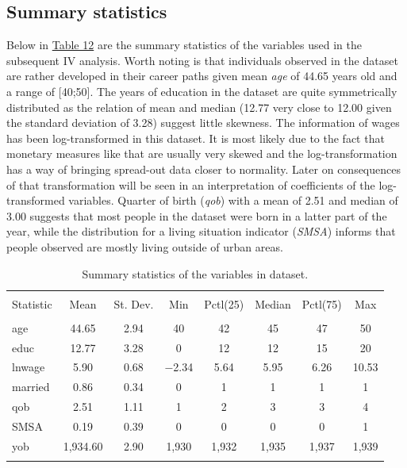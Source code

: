 \documentclass{article}
\begin{document}
\subsection{Summary statistics}

Below in \hyperref[tab:descriptiveIV]{Table 12} are the summary statistics of the variables used in the subsequent IV analysis. Worth noting is that individuals observed in the dataset are rather developed in their career paths given mean \textit{age} of 44.65 years old and a range of [40;50]. The years of education in the dataset are quite symmetrically distributed as the relation of mean and median (12.77 very close to 12.00 given the standard deviation of 3.28) suggest little skewness. The information of wages has been log-transformed in this dataset. It is most likely due to the fact that monetary measures like that are usually very skewed and the log-transformation has a way of bringing spread-out data closer to normality. Later on consequences of that transformation will be seen in an interpretation of coefficients of the log-transformed variables. Quarter of birth (\textit{qob}) with a mean of 2.51 and median of 3.00 suggests that most people in the dataset were born in a latter part of the year, while the distribution for a living situation indicator (\textit{SMSA}) informs that people observed are mostly living outside of urban areas.

\begin{table}[!htbp] \centering 
  \caption{Summary statistics of the variables in dataset.} 
  \label{tab:descriptiveIV} 
\begin{tabular}{@{\extracolsep{5pt}}lccccccc} 
\\[-1.8ex]\hline 
\hline \\[-1.8ex] 
Statistic & \multicolumn{1}{c}{Mean} & \multicolumn{1}{c}{St. Dev.} & \multicolumn{1}{c}{Min} & \multicolumn{1}{c}{Pctl(25)} & \multicolumn{1}{c}{Median} & \multicolumn{1}{c}{Pctl(75)} & \multicolumn{1}{c}{Max} \\ 
\hline \\[-1.8ex] 
age & 44.65 & 2.94 & 40 & 42 & 45 & 47 & 50 \\ 
educ & 12.77 & 3.28 & 0 & 12 & 12 & 15 & 20 \\ 
lnwage & 5.90 & 0.68 & $-$2.34 & 5.64 & 5.95 & 6.26 & 10.53 \\ 
married & 0.86 & 0.34 & 0 & 1 & 1 & 1 & 1 \\ 
qob & 2.51 & 1.11 & 1 & 2 & 3 & 3 & 4 \\ 
SMSA & 0.19 & 0.39 & 0 & 0 & 0 & 0 & 1 \\ 
yob & 1,934.60 & 2.90 & 1,930 & 1,932 & 1,935 & 1,937 & 1,939 \\ 
\hline \\[-1.8ex] 
\end{tabular} 
\end{table} 
\end{document}
